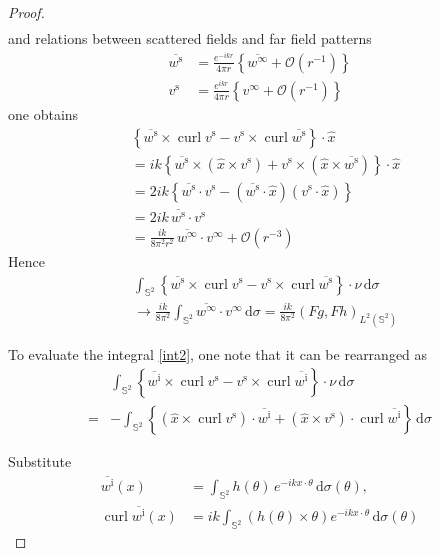 \documentclass[a4paper,12pt]{article}
\theoremstyle{definition}
\newcommand\intbn[1]{\int_{\mathbb{S}^2}#1\,\text{d}\sigma}
\newcommand\intc[2][(\theta)]{\int_{\mathbb{S}^2}#2\,\text{d}\sigma#1}
\newcommand\intcn[1]{\int_{\mathbb{S}^2}#1\,\text{d}\sigma}
\DeclareMathOperator\curl{curl}
\begin{document}
\begin{proof}
\begin{align}
  \end{align}
  and relations between scattered fields and far field patterns
  \begin{align*}
    \overline{w^\text{s}} &= \frac{e^{-ikr}}{4\pi r}\left\{\overline{w^\infty} + \mathcal{O}\left(r^{-1}\right)\right\} \\
    v^\text{s} &= \frac{e^{ikr}}{4\pi r}\left\{v^\infty + \mathcal{O}\left(r^{-1}\right)\right\} 
  \end{align*}
  one obtains
  \begin{align*}
    &\left\{\overline{w^\text{s}}\times\curl{v^\text{s}} - v^\text{s}\times\curl{\overline{w^\text{s}}}\right\}\cdot\hat{x}\\
    &=ik\left\{\overline{w^\text{s}}\times\left(\hat{x}\times v^\text{s}\right)+v^\text{s}\times\left(\hat{x}\times\overline{w^\text{s}}\right)\right\}\cdot\hat{x} \\
    &=2ik\left\{\overline{w^\text{s}}\cdot v^\text{s}-\left(\overline{w^\text{s}}\cdot\hat{x}\right)\left(v^\text{s}\cdot\hat{x}\right)\right\}\\
    &=2ik\,\overline{w^\text{s}}\cdot v^\text{s}\\
    &=\frac{ik}{8\pi^2 r^2}\,\overline{w^\infty}\cdot v^\infty + \mathcal{O}\left(r^{-3}\right)
  \end{align*}
  Hence
  \begin{align*}
    &\intbn{\left\{\overline{w^\text{s}}\times\curl{v^\text{s}} - v^\text{s}\times\curl{\overline{w^\text{s}}}\right\}\cdot\nu}\\ 
    &\longrightarrow \frac{ik}{8\pi^2}\intcn{\overline{w^\infty}\cdot v^\infty}=\frac{ik}{8\pi^2}\left(Fg, Fh\right)_{L^2(\mathbb{S}^2)}
  \end{align*}

  To evaluate the integral \eqref{int2}, one note that it can be rearranged as
  \begin{align}
    &\intbn{\left\{\overline{w^\text{i}}\times\curl{v^\text{s}}-v^\text{s}\times\curl{\overline{w^\text{i}}}\right\}\cdot\nu} \\
    =&-\intbn{\left\{\left(\hat{x}\times\curl{v^\text{s}}\right)\cdot\overline{w^\text{i}}+\left(\hat{x}\times v^\text{s}\right)\cdot\curl{\overline{w^\text{i}}}\right\}} \label{int2a}
  \end{align}

  Substitute  
  \begin{align*}
    \overline{w^\text{i}}(x) &= \intc{h(\theta)\,e^{-i k x\cdot\theta}}, \\
    \curl{\overline{w^\text{i}}(x)} &= ik\intc{\left(h(\theta)\times\theta\right)e^{-i k x\cdot\theta}}
  \end{align*}
  

\end{proof}
\end{document}
